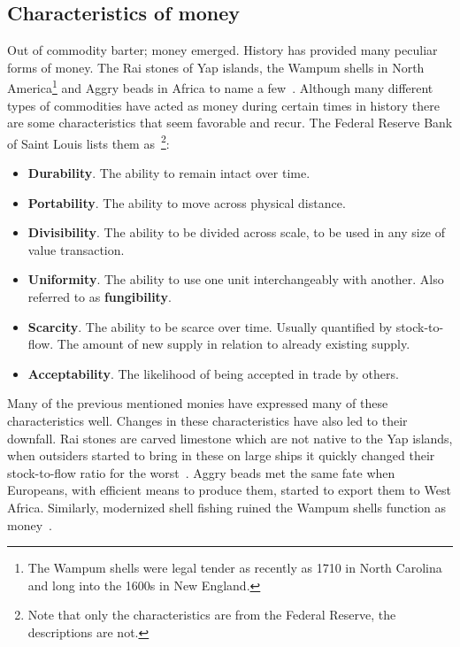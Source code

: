 \subsection{Characteristics of money}
	\label{sec:characteristics:money}

Out of commodity barter; money emerged. History has provided many peculiar forms of money. The Rai stones of Yap islands, the Wampum shells in North America\footnote{The Wampum shells were legal tender as recently as 1710 in North Carolina and long into the 1600s in New England.} and Aggry beads in Africa to name a few~\cite{szabo:shelling:out}. Although many different types of commodities have acted as money during certain times in history there are some characteristics that seem favorable and recur. The Federal Reserve Bank of Saint Louis lists them as~\cite{fed:function:money}\footnote{Note that only the characteristics are from the Federal Reserve, the descriptions are not.}:

\begin{itemize}
	\item \textbf{Durability}. The ability to remain intact over time.
	
	\item \textbf{Portability}. The ability to move across physical distance.
	
	\item \textbf{Divisibility}. The ability to be divided across scale, to be used in any size of value transaction.
	
	\item \textbf{Uniformity}. The ability to use one unit interchangeably with another. Also referred to as \textbf{fungibility}.
	
	\item \textbf{Scarcity}. The ability to be scarce over time. Usually quantified by stock-to-flow. The amount of new supply in relation to already existing supply.
	
	\item \textbf{Acceptability}. The likelihood of being accepted in trade by others.
\end{itemize}

Many of the previous mentioned monies have expressed many of these characteristics well. Changes in these characteristics have also led to their downfall. Rai stones are carved limestone which are not native to the Yap islands, when outsiders started to bring in these on large ships it quickly changed their stock-to-flow ratio for the worst~\cite{ammous:bitcoin:standard}. Aggry beads met the same fate when Europeans, with efficient means to produce them, started to export them to West Africa. Similarly, modernized shell fishing ruined the Wampum shells function as money~\cite{szabo:shelling:out}.

